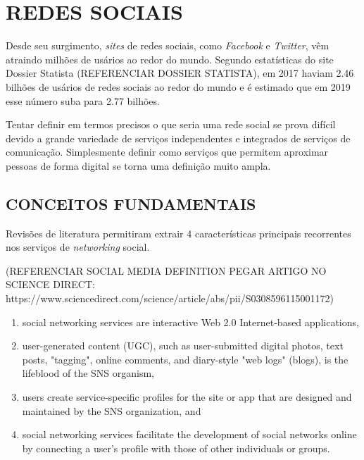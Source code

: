 
%

\chapter{REDES SOCIAIS}
\label{chap:redesSociais}
Desde seu surgimento, \textit{sites} de redes sociais, como \textit{Facebook} e \textit{Twitter}, vêm atraindo milhões de usários ao redor do mundo. Segundo estatísticas do site Dossier Statista (REFERENCIAR DOSSIER STATISTA), em 2017 haviam 2.46 bilhões de usários de redes sociais ao redor do mundo e é estimado que em 2019 esse número suba para 2.77 bilhões.

Tentar definir em termos precisos o que seria uma rede social se prova difícil devido a grande variedade de serviços independentes e integrados de serviços de comunicação. Simplesmente definir como serviços que permitem aproximar pessoas de forma digital se torna uma definição muito ampla.

\section{CONCEITOS FUNDAMENTAIS}
\label{sec:conceitosRedesSociais}
 Revisões de literatura permitiram extrair 4 características principais recorrentes nos serviços de \textit{networking} social.

(REFERENCIAR SOCIAL MEDIA DEFINITION PEGAR ARTIGO NO SCIENCE DIRECT: https://www.sciencedirect.com/science/article/abs/pii/S0308596115001172)

\begin{enumerate}
	\item social networking services are interactive Web 2.0 Internet-based applications,
	\item user-generated content (UGC), such as user-submitted digital photos, text posts, "tagging", online comments, and diary-style "web logs" (blogs), is the lifeblood of the SNS organism,
	\item users create service-specific profiles for the site or app that are designed and maintained by the SNS organization, and
	\item social networking services facilitate the development of social networks online by connecting a user's profile with those of other individuals or groups.
\end{enumerate}

